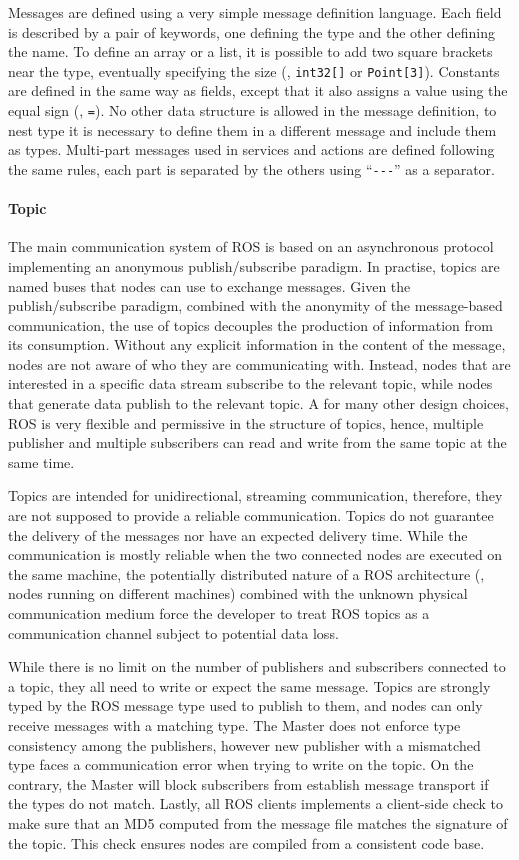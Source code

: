 Messages are defined using a very simple message definition language. Each field is described by a pair of keywords, one defining the type and the other defining the name. To define an array or a list, it is possible to add two square brackets near the type, eventually specifying the size (\eg, \texttt{int32[]} or \texttt{Point[3]}). Constants are defined in the same way as fields, except that it also assigns a value using the equal sign (\ie, \texttt{=}). No other data structure is allowed in the message definition, to nest type it is necessary to define them in a different message and include them as types. Multi-part messages used in services and actions are defined following the same rules, each part is separated by the others using ``\texttt{-{}-{}-}'' as a separator.

\paragraph{Topic} The main communication system of ROS is based on an asynchronous protocol implementing an anonymous publish/subscribe paradigm. In practise, topics are named buses that nodes can use to exchange messages. Given the publish/subscribe paradigm, combined with the anonymity of the message-based communication, the use of topics decouples the production of information from its consumption. Without any explicit information in the content of the message, nodes are not aware of who they are communicating with. Instead, nodes that are interested in a specific data stream subscribe to the relevant topic, while nodes that generate data publish to the relevant topic. A for many other design choices, ROS is very flexible and permissive in the structure of topics, hence, multiple publisher and multiple subscribers can read and write from the same topic at the same time.

Topics are intended for unidirectional, streaming communication, therefore, they are not supposed to provide a reliable communication. Topics do not guarantee the delivery of the messages nor have an expected delivery time. While the communication is mostly reliable when the two connected nodes are executed on the same machine, the potentially distributed nature of a ROS architecture (\ie, nodes running on different machines) combined with the unknown physical communication medium force the developer to treat ROS topics as a communication channel subject to potential data loss.

While there is no limit on the number of publishers and subscribers connected to a topic, they all need to write or expect the same message. Topics are strongly typed by the ROS message type used to publish to them, and nodes can only receive messages with a matching type. The Master does not enforce type consistency among the publishers, however new publisher with a mismatched type faces a communication error when trying to write on the topic. On the contrary, the Master will block subscribers from establish message transport if the types do not match. Lastly, all ROS clients implements a client-side check to make sure that an MD5 computed from the message file matches the signature of the topic. This check ensures nodes are compiled from a consistent code base.

